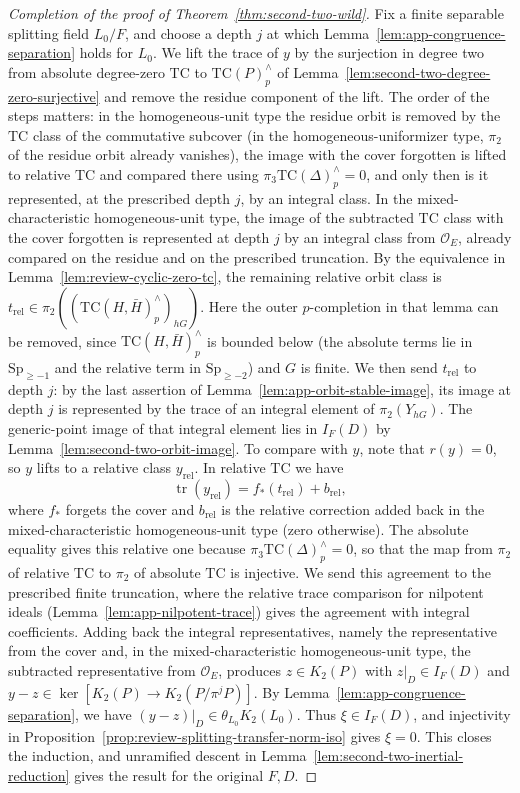 \begin{proof}[Completion of the proof of Theorem~\ref{thm:second-two-wild}]
Fix a finite separable splitting field $L_0/F$, and choose a depth $j$ at which Lemma~\ref{lem:app-congruence-separation} holds for $L_0$.
We lift the trace of $y$ by the surjection in degree two from absolute degree-zero $\mathrm{TC}$ to $\mathrm{TC}(P)^\wedge_p$ of Lemma~\ref{lem:second-two-degree-zero-surjective} and remove the residue component of the lift.
The order of the steps matters: in the homogeneous-unit type the residue orbit is removed by the $\mathrm{TC}$ class of the commutative subcover (in the homogeneous-uniformizer type, $\pi_2$ of the residue orbit already vanishes), the image with the cover forgotten is lifted to relative $\mathrm{TC}$ and compared there using $\pi_3\mathrm{TC}(\Delta)^\wedge_p=0$, and only then is it represented, at the prescribed depth $j$, by an integral class.
In the mixed-characteristic homogeneous-unit type, the image of the subtracted $\mathrm{TC}$ class with the cover forgotten is represented at depth $j$ by an integral class from $\mathcal O_E$, already compared on the residue and on the prescribed truncation.
By the equivalence in Lemma~\ref{lem:review-cyclic-zero-tc}, the remaining relative orbit class is $t_{\mathrm{rel}}\in\pi_2((\mathrm{TC}(H,\bar H)^\wedge_p)_{hG})$.
Here the outer $p$-completion in that lemma can be removed, since $\mathrm{TC}(H,\bar H)^\wedge_p$ is bounded below (the absolute terms lie in $\mathrm{Sp}_{\ge-1}$ and the relative term in $\mathrm{Sp}_{\ge-2}$) and $G$ is finite.
We then send $t_{\mathrm{rel}}$ to depth $j$: by the last assertion of Lemma~\ref{lem:app-orbit-stable-image}, its image at depth $j$ is represented by the trace of an integral element of $\pi_2(Y_{hG})$.
The generic-point image of that integral element lies in $I_F(D)$ by Lemma~\ref{lem:second-two-orbit-image}.
To compare with $y$, note that $r(y)=0$, so $y$ lifts to a relative class $y_{\mathrm{rel}}$.
In relative $\mathrm{TC}$ we have
\[
 \operatorname{tr}(y_{\mathrm{rel}})=f_*(t_{\mathrm{rel}})+b_{\mathrm{rel}},
\]
where $f_*$ forgets the cover and $b_{\mathrm{rel}}$ is the relative correction added back in the mixed-characteristic homogeneous-unit type (zero otherwise).
The absolute equality gives this relative one because $\pi_3\mathrm{TC}(\Delta)^\wedge_p=0$, so that the map from $\pi_2$ of relative $\mathrm{TC}$ to $\pi_2$ of absolute $\mathrm{TC}$ is injective.
We send this agreement to the prescribed finite truncation, where the relative trace comparison for nilpotent ideals (Lemma~\ref{lem:app-nilpotent-trace}) gives the agreement with integral coefficients.
Adding back the integral representatives, namely the representative from the cover and, in the mixed-characteristic homogeneous-unit type, the subtracted representative from $\mathcal O_E$, produces $z\in K_2(P)$ with $z|_D\in I_F(D)$ and $y-z\in\ker[K_2(P)\to K_2(P/\pi^jP)]$.
By Lemma~\ref{lem:app-congruence-separation}, we have $(y-z)|_D\in\theta_{L_0}K_2(L_0)$.
Thus $\xi\in I_F(D)$, and injectivity in Proposition~\ref{prop:review-splitting-transfer-norm-iso} gives $\xi=0$.
This closes the induction, and unramified descent in Lemma~\ref{lem:second-two-inertial-reduction} gives the result for the original $F,D$.
\end{proof}

